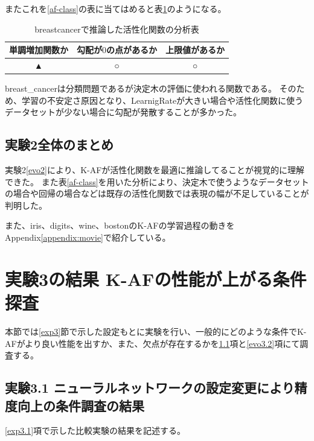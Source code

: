 またこれを\ref{af-class}の表に当てはめると表\ref{anal_breastcancer}のようになる。
\begin{table}[htbp]
    \begin{center}
        \caption{breastcancerで推論した活性化関数の分析表}
        \label{anal_breastcancer}
        \vspace{2mm} 
        \begin{tabular}{ |c|c|c| }
        \hline
        単調増加関数か & 勾配が$ 0 $の点があるか & 上限値があるか   \\
        \hline
        ▲ & ○ & ○   \\
        \hline
        \end{tabular}
    \end{center}
\end{table}


breast\_cancerは分類問題であるが決定木の評価に使われる関数である。
そのため、学習の不安定さ原因となり、LearnigRateが大きい場合や活性化関数に使うデータセットが少ない場合に勾配が発散することが多かった。




\subsection{実験2全体のまとめ}
実験2\ref{evo2}により、K-AFが活性化関数を最適に推論してることが視覚的に理解できた。
また表\ref{af-class}を用いた分析により、決定木で使うようなデータセットの場合や回帰の場合などは既存の活性化関数では表現の幅が不足していることが判明した。

また、iris、digits、wine、bostonのK-AFの学習過程の動きをAppendix\ref{appendix:movie}で紹介している。









\section{実験3の結果 K-AFの性能が上がる条件探査}
\label{evo3}

本節では\ref{exp3}節で示した設定もとに実験を行い、一般的にどのような条件でK-AFがより良い性能を出すか、また、欠点が存在するかを\ref{evo3.1}項と\ref{evo3.2}項にて調査する。


\subsection{実験3.1 ニューラルネットワークの設定変更により精度向上の条件調査の結果}
\label{evo3.1}
\ref{exp3.1}項で示した比較実験の結果を記述する。


